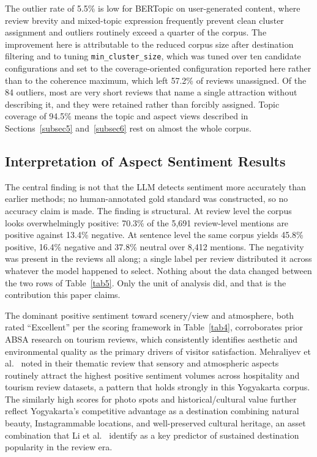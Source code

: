 \documentclass[pdflatex,sn-mathphys-num]{sn-jnl}
\begin{document}
The outlier rate of 5.5\% is low for BERTopic on user-generated content, where review brevity and mixed-topic expression frequently prevent clean cluster assignment and outliers routinely exceed a quarter of the corpus. The improvement here is attributable to the reduced corpus size after destination filtering and to tuning \texttt{min\_cluster\_size}, which was tuned over ten candidate configurations and set to the coverage-oriented configuration reported here rather than to the coherence maximum, which left 57.2\% of reviews unassigned. Of the 84 outliers, most are very short reviews that name a single attraction without describing it, and they were retained rather than forcibly assigned. Topic coverage of 94.5\% means the topic and aspect views described in Sections~\ref{subsec5} and~\ref{subsec6} rest on almost the whole corpus.

\subsection{Interpretation of Aspect Sentiment Results}\label{subsec9}

The central finding is not that the LLM detects sentiment more accurately than earlier methods; no human-annotated gold standard was constructed, so no accuracy claim is made. The finding is structural. At review level the corpus looks overwhelmingly positive: 70.3\% of the 5,691 review-level mentions are positive against 13.4\% negative. At sentence level the same corpus yields 45.8\% positive, 16.4\% negative and 37.8\% neutral over 8,412 mentions. The negativity was present in the reviews all along; a single label per review distributed it across whatever the model happened to select. Nothing about the data changed between the two rows of Table~\ref{tab5}. Only the unit of analysis did, and that is the contribution this paper claims.

The dominant positive sentiment toward scenery/view and atmosphere, both rated ``Excellent'' per the scoring framework in Table~\ref{tab4}, corroborates prior ABSA research on tourism reviews, which consistently identifies aesthetic and environmental quality as the primary drivers of visitor satisfaction. Mehraliyev et al.\ \cite{bib24} noted in their thematic review that sensory and atmospheric aspects routinely attract the highest positive sentiment volumes across hospitality and tourism review datasets, a pattern that holds strongly in this Yogyakarta corpus. The similarly high scores for photo spots and historical/cultural value further reflect Yogyakarta's competitive advantage as a destination combining natural beauty, Instagrammable locations, and well-preserved cultural heritage, an asset combination that Li et al.\ \cite{bib14} identify as a key predictor of sustained destination popularity in the review era.
\end{document}

